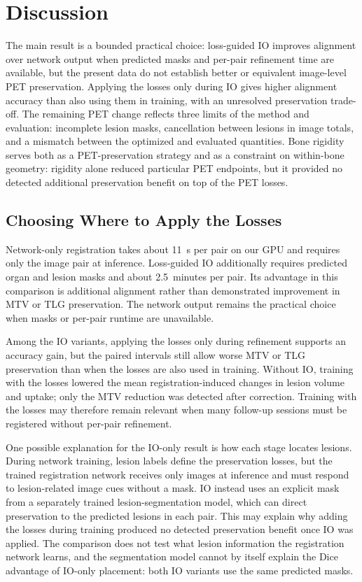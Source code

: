 \section{Discussion}
\label{sect:discussion}

The main result is a bounded practical choice: loss-guided IO improves alignment over network output when predicted masks and per-pair refinement time are available, but the present data do not establish better or equivalent image-level PET preservation.
Applying the losses only during IO gives higher alignment accuracy than also using them in training, with an unresolved preservation trade-off.
The remaining PET change reflects three limits of the method and evaluation: incomplete lesion masks, cancellation between lesions in image totals, and a mismatch between the optimized and evaluated quantities.
Bone rigidity serves both as a PET-preservation strategy and as a constraint on within-bone geometry: rigidity alone reduced particular PET endpoints, but it provided no detected additional preservation benefit on top of the PET losses.

\subsection{Choosing Where to Apply the Losses}
Network-only registration takes about 11~s per pair on our GPU and requires only the image pair at inference.
Loss-guided IO additionally requires predicted organ and lesion masks and about 2.5~minutes per pair.
Its advantage in this comparison is additional alignment rather than demonstrated improvement in MTV or TLG preservation.
The network output remains the practical choice when masks or per-pair runtime are unavailable.

Among the IO variants, applying the losses only during refinement supports an accuracy gain, but the paired intervals still allow worse MTV or TLG preservation than when the losses are also used in training.
Without IO, training with the losses lowered the mean registration-induced changes in lesion volume and uptake; only the MTV reduction was detected after correction.
Training with the losses may therefore remain relevant when many follow-up sessions must be registered without per-pair refinement.

One possible explanation for the IO-only result is how each stage locates lesions.
During network training, lesion labels define the preservation losses, but the trained registration network receives only images at inference and must respond to lesion-related image cues without a mask.
IO instead uses an explicit mask from a separately trained lesion-segmentation model, which can direct preservation to the predicted lesions in each pair.
This may explain why adding the losses during training produced no detected preservation benefit once IO was applied.
The comparison does not test what lesion information the registration network learns, and the segmentation model cannot by itself explain the Dice advantage of IO-only placement: both IO variants use the same predicted masks.


